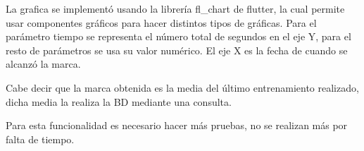 \hspace{0.5cm}

La grafica se implementó usando la librería fl\_chart de flutter, la cual permite usar componentes gráficos para hacer distintos tipos de gráficas. Para el parámetro tiempo se representa el número total de segundos en el eje Y, para el resto de parámetros se usa su valor numérico. El eje X es la fecha de cuando se alcanzó la marca.

Cabe decir que la marca obtenida es la media del último entrenamiento realizado, dicha media la realiza la BD mediante una consulta.

Para esta funcionalidad es necesario hacer más pruebas, no se realizan más por falta de tiempo.